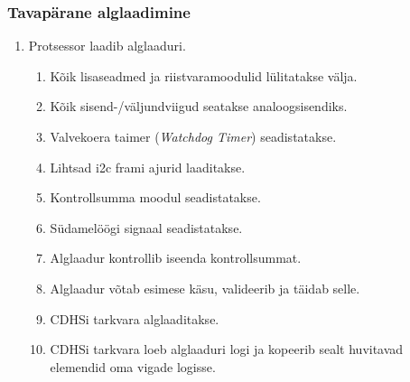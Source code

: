 \documentclass[12pt,a4paper]{article}
\begin{document}
\subsubsection{Tavapärane alglaadimine}
\label{sec:usecase:default}
\begin{enumerate}
	\item Protsessor laadib alglaaduri.
		\begin{enumerate}
			\item Kõik lisaseadmed ja riistvaramoodulid lülitatakse välja.
			\item Kõik sisend-/väljundviigud seatakse analoogsisendiks.
			\item Valvekoera taimer (\textit{Watchdog Timer}) seadistatakse.
			\item Lihtsad \gls{i2c} \gls{fram}i ajurid laaditakse.
			\item Kontrollsumma moodul seadistatakse.
			\item Südamelöögi signaal seadistatakse.
			\item Alglaadur kontrollib iseenda kontrollsummat.
			\item Alglaadur võtab esimese käsu, valideerib ja täidab selle.
			\item CDHSi tarkvara alglaaditakse.
			\item CDHSi tarkvara loeb alglaaduri logi ja kopeerib sealt
				huvitavad elemendid oma vigade logisse.
		\end{enumerate}
\end{enumerate}
\end{document}
